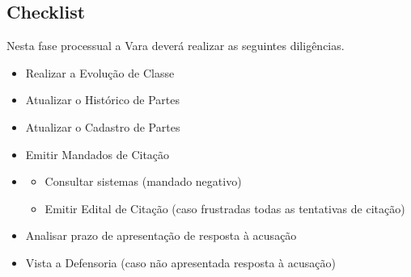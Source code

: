 \documentclass[letterpaper,10pt,brazil]{sphinxmanual}
\begin{document}
\subsection{Checklist}
\label{\detokenize{03recebimento_denuncia:checklist}}
\sphinxAtStartPar
Nesta fase processual a Vara deverá realizar as seguintes diligências.
\begin{itemize}
\item {} 
\sphinxAtStartPar
Realizar a Evolução de Classe

\item {} 
\sphinxAtStartPar
Atualizar o Histórico de Partes

\item {} 
\sphinxAtStartPar
Atualizar o Cadastro de Partes

\item {} 
\sphinxAtStartPar
Emitir Mandados de Citação

\item {} \begin{description}
\begin{itemize}
\item {} 
\sphinxAtStartPar
Consultar sistemas (mandado negativo)

\item {} 
\sphinxAtStartPar
Emitir Edital de Citação (caso frustradas todas as tentativas de citação)

\end{itemize}

\end{description}

\item {} 
\sphinxAtStartPar
Analisar prazo de apresentação de resposta à acusação

\item {} 
\sphinxAtStartPar
Vista a Defensoria (caso não apresentada resposta à acusação)

\end{itemize}
\end{document}

